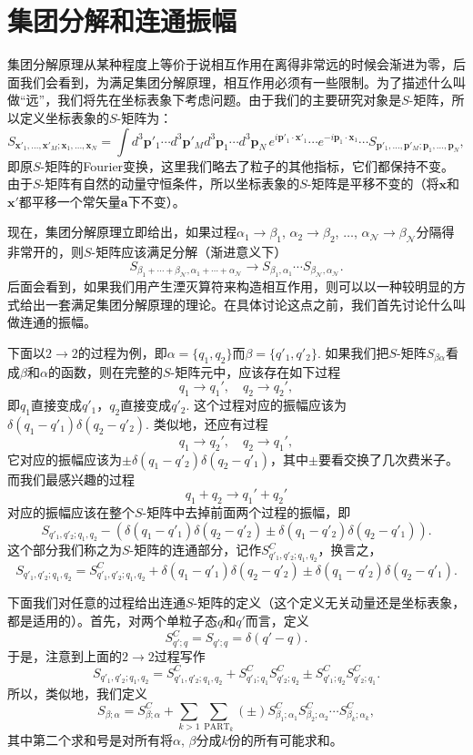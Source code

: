 \documentclass[11pt]{article}
\theoremstyle{definition}
\theoremstyle{plain}
\begin{document}
\section{集团分解和连通振幅}

集团分解原理从某种程度上等价于说相互作用在离得非常远的时候会渐进为零，后面我们会看到，为满足集团分解原理，相互作用必须有一些限制。为了描述什么叫做“远”，我们将先在坐标表象下考虑问题。由于我们的主要研究对象是$S$-矩阵，所以定义坐标表象的$S$-矩阵为：
\[
	S_{\bm{x}'_1,\dots,\bm{x}'_M;\bm{x}_1,\dots,\bm{x}_N}=\int d^3\bm{p}'_1\cdots d^3\bm{p}'_M d^3\bm{p}_1\cdots d^3\bm{p}_N \,e^{i\bm{p}'_1\cdot \bm{x}'_1}\cdots e^{-i\bm{p}_1\cdot \bm{x}_1}\cdots S_{\bm{p}'_1,\dots,\bm{p}'_M;\bm{p}_1,\dots,\bm{p}_N},
\]
即原$S$-矩阵的Fourier变换，这里我们略去了粒子的其他指标，它们都保持不变。由于$S$-矩阵有自然的动量守恒条件，所以坐标表象的$S$-矩阵是平移不变的（将$\bm{x}$和$\bm{x}'$都平移一个常矢量$\bm{a}$下不变）。

现在，集团分解原理立即给出，如果过程$\alpha_1\to \beta_1$, $\alpha_2\to \beta_2$, $\dots$, $\alpha_\mathscr{N}\to \beta_\mathscr{N}$分隔得非常开的，则$S$-矩阵应该满足分解（渐进意义下）
\[
	S_{\beta_1+\cdots+\beta_{\mathscr N},\alpha_1+\cdots+\alpha_{\mathscr N}}\to S_{\beta_1,\alpha_1}\cdots S_{\beta_{\mathscr N},\alpha_{\mathscr N}}.
\]
后面会看到，如果我们用产生湮灭算符来构造相互作用，则可以以一种较明显的方式给出一套满足集团分解原理的理论。在具体讨论这点之前，我们首先讨论什么叫做连通的振幅。

下面以$2\to 2$的过程为例，即$\alpha=\{q_1,q_2\}$而$\beta=\{q'_1,q'_2\}$. 如果我们把$S$-矩阵$S_{\beta\alpha}$看成$\beta$和$\alpha$的函数，则在完整的$S$-矩阵元中，应该存在如下过程
\[
	q_1\to q_1',\quad q_2\to q_2',
\]
即$q_1$直接变成$q'_1$，$q_2$直接变成$q'_2$. 这个过程对应的振幅应该为$\delta(q_1-q'_1)\delta(q_2-q'_2)$. 类似地，还应有过程
\[
	q_1\to q_2',\quad q_2\to q_1',
\]
它对应的振幅应该为$\pm \delta(q_1-q'_2)\delta(q_2-q'_1)$，其中$\pm$要看交换了几次费米子。而我们最感兴趣的过程
\[
	q_1+q_2\to q_1'+q_2'
\]
对应的振幅应该在整个$S$-矩阵中去掉前面两个过程的振幅，即
\[
	S_{q'_1,q'_2;q_1,q_2}-(\delta(q_1-q'_1)\delta(q_2-q'_2)\pm \delta(q_1-q'_2)\delta(q_2-q'_1)).
\]
这个部分我们称之为$S$-矩阵的连通部分，记作$S^C_{q'_1,q'_2;q_1,q_2}$，换言之，
\[
	S_{q'_1,q'_2;q_1,q_2}=S^C_{q'_1,q'_2;q_1,q_2}+\delta(q_1-q'_1)\delta(q_2-q'_2)\pm \delta(q_1-q'_2)\delta(q_2-q'_1).
\]

下面我们对任意的过程给出连通$S$-矩阵的定义（这个定义无关动量还是坐标表象，都是适用的）。首先，对两个单粒子态$q$和$q'$而言，定义
\[
	S^C_{q';q}=S_{q';q}=\delta(q'-q).
\]
于是，注意到上面的$2\to 2$过程写作
\[
	S_{q'_1,q'_2;q_1,q_2}=S^C_{q'_1,q'_2;q_1,q_2}+S^C_{q'_1;q_1}S^C_{q'_2;q_2}\pm S^C_{q'_1;q_2}S^C_{q'_2;q_1}.
\]
所以，类似地，我们定义
\[
	S_{\beta;\alpha}=S^C_{\beta;\alpha}+\sum_{k>1}\sum_{\text{PART}_k} (\pm) S^C_{\beta_1;\alpha_1}S^C_{\beta_2;\alpha_2}\cdots S^C_{\beta_k;\alpha_k},
\]
其中第二个求和号是对所有将$\alpha$, $\beta$分成$k$份的所有可能求和。
\end{document}
